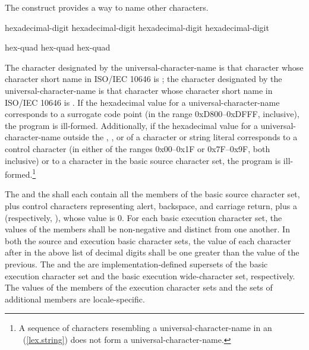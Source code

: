 \pnum
The  construct provides a way to name
other characters.

\begin{bnf}
\br
    hexadecimal-digit hexadecimal-digit hexadecimal-digit hexadecimal-digit
\end{bnf}

\begin{bnf}
\br
     hex-quad\br
     hex-quad hex-quad
\end{bnf}

The character designated by the universal-character-name  is that character whose character short name in ISO/IEC 10646 is
; the character designated by the universal-character-name
 is that character whose character short name in
ISO/IEC 10646 is . If the hexadecimal value for a
universal-character-name corresponds to a surrogate code point (in the
range 0xD800--0xDFFF, inclusive), the program is ill-formed. Additionally, if
the hexadecimal value for a universal-character-name outside
the , , or
 of
a character or
string literal corresponds to a control character (in either of the
ranges 0x00--0x1F or 0x7F--0x9F, both inclusive) or to a character in the basic
source character set, the program is ill-formed.\footnote{A sequence of characters resembling a universal-character-name in an
~(\ref{lex.string}) does not form a
universal-character-name.}

\pnum
The  and the  shall each contain all the members of the
basic source character set, plus control characters representing alert,
backspace, and carriage return, plus a 
(respectively, ), whose value is 0.
For each basic execution character set, the values of the
members shall be non-negative and distinct from one another. In both the
source and execution basic character sets, the value of each character
after  in the above list of decimal digits shall be one greater
than the value of the previous. The 
and the  are
implementation-defined
supersets of the
basic execution character set and the basic execution wide-character
set, respectively. The values of the members of the execution character sets
and the sets of additional members
are locale-specific.%

